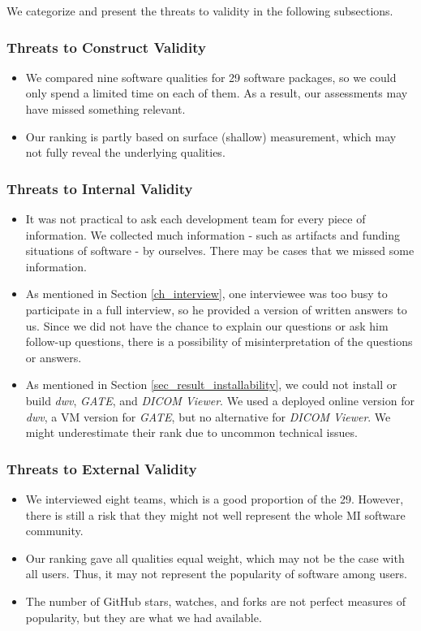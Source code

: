 \documentclass[3p, 12pt,authoryear]{elsarticle}
\begin{document}
\noindent We categorize and present the threats to validity in the following subsections.

\subsubsection{Threats to Construct Validity}
\begin{itemize}
\item We compared nine software qualities for 29 software packages, so we could
only spend a limited time on each of them. As a result, our assessments may have
missed something relevant.
\item Our ranking is partly based on surface (shallow) measurement, which may
not fully reveal the underlying qualities.
\end{itemize}

\subsubsection{Threats to Internal Validity}
\begin{itemize}
\item It was not practical to ask each development team for every piece of
information. We collected much information - such as artifacts and funding
situations of software - by ourselves. There may be cases that we missed some
information.
\item As mentioned in Section \ref{ch_interview}, one interviewee was too busy
to participate in a full interview, so he provided a version of written answers
to us. Since we did not have the chance to explain our questions or ask him
follow-up questions, there is a possibility of misinterpretation of the
questions or answers.
\item As mentioned in Section \ref{sec_result_installability}, we could not
install or build \textit{dwv}, \textit{GATE}, and \textit{DICOM Viewer}. We used
a deployed online version for \textit{dwv}, a VM version for \textit{GATE}, but
no alternative for \textit{DICOM Viewer}. We might underestimate their rank due
to uncommon technical issues.
\end{itemize}

\subsubsection{Threats to External Validity}
\begin{itemize}
\item We interviewed eight teams, which is a good proportion of the 29. However,
there is still a risk that they might not well represent the whole MI software
community.
\item Our ranking gave all qualities equal weight, which may not be the case
with all users. Thus, it may not represent the popularity of software among
users.
\item The number of GitHub stars, watches, and forks are not perfect measures of
popularity, but they are what we had available.
\end{itemize}
\end{document}
